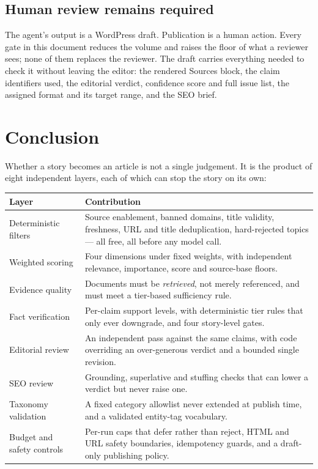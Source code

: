 \documentclass[11pt,a4paper]{article}
\begin{document}
\subsection{Human review remains required}

\begin{blockbox}
The agent's output is a WordPress draft. Publication is a human action. Every gate
in this document reduces the volume and raises the floor of what a reviewer sees;
none of them replaces the reviewer. The draft carries everything needed to check it
without leaving the editor: the rendered Sources block, the claim identifiers used,
the editorial verdict, confidence score and full issue list, the assigned format
and its target range, and the SEO brief.
\end{blockbox}

\section{Conclusion}

Whether a story becomes an article is not a single judgement. It is the product of
eight independent layers, each of which can stop the story on its own:

\begin{center}
\small
\begin{tabularx}{\textwidth}{@{}p{4.3cm} >{\RaggedRight}X@{}}
\toprule
\textbf{Layer} & \textbf{Contribution} \\
\midrule
Deterministic filters & Source enablement, banned domains, title validity,
  freshness, URL and title deduplication, hard-rejected topics --- all free, all
  before any model call. \\
Weighted scoring & Four dimensions under fixed weights, with independent relevance,
  importance, score and source-base floors. \\
Evidence quality & Documents must be \emph{retrieved}, not merely referenced, and
  must meet a tier-based sufficiency rule. \\
Fact verification & Per-claim support levels, with deterministic tier rules that
  only ever downgrade, and four story-level gates. \\
Editorial review & An independent pass against the same claims, with code
  overriding an over-generous verdict and a bounded single revision. \\
SEO review & Grounding, superlative and stuffing checks that can lower a verdict
  but never raise one. \\
Taxonomy validation & A fixed category allowlist never extended at publish time,
  and a validated entity-tag vocabulary. \\
Budget and safety controls & Per-run caps that defer rather than reject, HTML and
  URL safety boundaries, idempotency guards, and a draft-only publishing policy. \\
\bottomrule
\end{tabularx}
\end{center}
\end{document}
